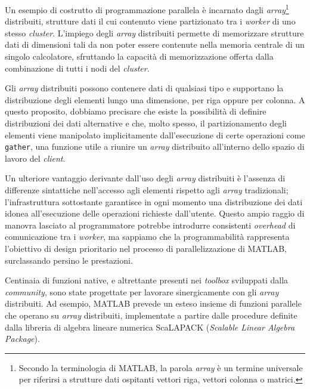 Un esempio di costrutto di programmazione parallela \`e incarnato dagli \textit{array}\footnote{Secondo la terminologia di MATLAB, la parola \textit{array} \`e un termine universale per riferirsi a strutture dati ospitanti vettori riga, vettori colonna o matrici.}
distribuiti, strutture dati il cui contenuto viene partizionato tra i \textit{worker} di uno stesso \textit{cluster}.\newline
L'impiego degli \textit{array} distribuiti permette di memorizzare strutture dati di dimensioni tali da non poter essere contenute nella memoria centrale di un
singolo calcolatore, sfruttando la capacit\`a di memorizzazione offerta dalla combinazione di tutti i nodi del \textit{cluster}.

Gli \textit{array} distribuiti possono contenere dati di qualsiasi tipo e supportano la distribuzione degli elementi lungo una dimensione,
per riga oppure per colonna.\newline
A questo proposito, dobbiamo precisare che esiste la possibilit\`a di definire distribuzioni dei dati alternative e che, molto spesso, il partizionamento degli elementi viene manipolato implicitamente dall'esecuzione di certe operazioni
come \lstinline{gather}, una funzione utile a riunire un \textit{array} distribuito all'interno dello spazio di lavoro del \textit{client}.

Un ulteriore vantaggio derivante dall'uso degli \textit{array} distribuiti \`e l'assenza di differenze sintattiche nell'accesso agli elementi rispetto agli \textit{array} tradizionali; l'infrastruttura sottostante garantisce in ogni momento una distribuzione dei dati idonea all'esecuzione delle operazioni
richieste dall'utente.\newline
Questo ampio raggio di manovra lasciato al programmatore potrebbe introdurre consistenti \textit{overhead} di comunicazione tra i \textit{worker},
ma sappiamo che la programmabilit\`a rappresenta l'obiettivo di design prioritario nel processo di parallelizzazione di MATLAB, surclassando persino le prestazioni.

Centinaia di funzioni native, e altrettante presenti nei \textit{toolbox} sviluppati dalla \textit{community}, sono state progettate per lavorare sinergicamente con gli \textit{array} distribuiti.\newline
Ad esempio, MATLAB prevede un esteso insieme di funzioni parallele che operano su \textit{array} distribuiti, implementate a partire dalle procedure definite dalla libreria di algebra lineare numerica ScaLAPACK (\textit{Scalable Linear Algebra Package}).
